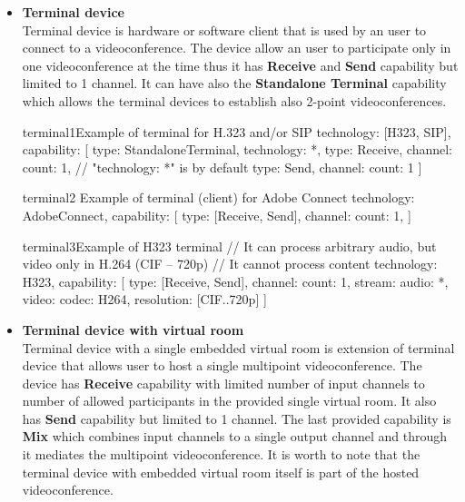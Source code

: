 \begin{itemize}

\item \textbf{Terminal device} \\
  Terminal device is hardware or software client that is used by an user to 
  connect to a videoconference. The device allow an user to participate only 
  in one videoconference at the time thus it has \textbf{Receive} and 
  \textbf{Send} capability but limited to 1 channel. It can have also the 
  \textbf{Standalone Terminal} capability which allows the terminal devices to  
  establish also 2-point videoconferences. 
  
\begin{TopologyExample}{terminal1}{Example of terminal for H.323 and/or SIP}
technology: [H323, SIP],
capability: [
  {type: StandaloneTerminal, technology: *},
  {type: Receive, channel: {count: 1}}, // "technology: *" is by default
  {type: Send, channel: {count: 1}}
]
\end{TopologyExample}

\begin{TopologyExample}{terminal2}
      {Example of terminal (client) for Adobe Connect}
technology: AdobeConnect,
capability: [
  {type: [Receive, Send], channel: {count: 1}},
]
\end{TopologyExample}

\begin{TopologyExample}{terminal3}{Example of H323 terminal}
// It can process arbitrary audio, but video only in H.264 (CIF -- 720p)
// It cannot process content
technology: H323,
capability: [
  {type: [Receive, Send], channel: {
    count: 1, 
    stream: {
      audio: *,
      video: {codec: H264, resolution: [CIF..720p]}
    }  
  }}
]
\end{TopologyExample}

\item \textbf{Terminal device with virtual room} \\
  Terminal device with a single embedded virtual room is extension of terminal 
  device that allows user to host a single multipoint videoconference. The 
  device has \textbf{Receive} capability with limited number of input channels 
  to number of allowed participants in the provided single virtual room. It 
  also has \textbf{Send} capability but limited to 1 channel. The last 
  provided capability is \textbf{Mix} which combines input channels to a 
  single output channel and through it mediates the multipoint 
  videoconference. It is worth to note that the terminal device with embedded 
  virtual room itself is part of 
  the hosted videoconference.
  

\end{itemize}

